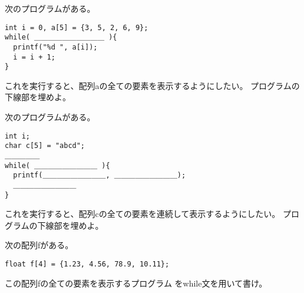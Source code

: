 \documentclass[12pt,a4j]{jarticle}
\newcounter{toi}
\def\toi{%
\bigskip\bigskip\noindent
\addtocounter{toi}{1}
\shadowbox{\bfseries\large 問\thetoi}
\nopagebreak[4]\bigskip\nopagebreak[4]
}
\begin{document}






\toi

次のプログラムがある。
\begin{verbatim}
int i = 0, a[5] = {3, 5, 2, 6, 9};
while( ＿＿＿＿＿＿＿＿＿＿ ){
  printf("%d ", a[i]);
  i = i + 1;
}
\end{verbatim}
これを実行すると、配列{\ttfamily a}の全ての要素を表示するようにしたい。
プログラムの下線部を埋めよ。





\toi

次のプログラムがある。
\begin{verbatim}
int i;
char c[5] = "abcd";
＿＿＿＿＿
while( ＿＿＿＿＿＿＿＿＿ ){
  printf(＿＿＿＿＿＿＿＿＿, ＿＿＿＿＿＿＿＿＿);
  ＿＿＿＿＿＿＿＿＿
}
\end{verbatim}
これを実行すると、配列{\ttfamily c}の全ての要素を連続して表示するようにしたい。
プログラムの下線部を埋めよ。






\toi

次の配列{\ttfamily f}がある。
\begin{verbatim}
float f[4] = {1.23, 4.56, 78.9, 10.11};
\end{verbatim}
この配列{\ttfamily f}の全ての要素を表示するプログラム
を{\ttfamily while}文を用いて書け。

\vspace*{3cm}

\end{document}
